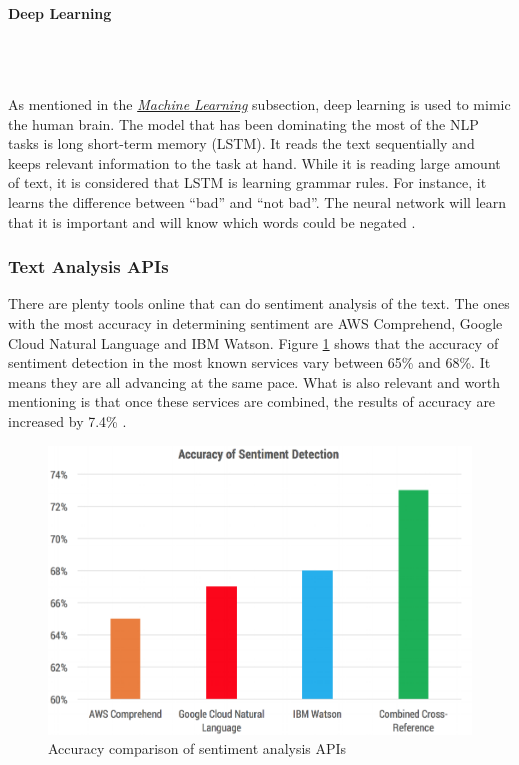 \documentclass{article}
\newcommand{\subsubsubsection}[1]{\paragraph{#1}\mbox{}\\}
\begin{document}
\subsubsubsection{Deep Learning}
{\large
\\As mentioned in the \hyperref[sec:ml]{\textit{Machine Learning}} subsection, deep learning is used to mimic the human brain. The model that has been dominating the most of the NLP tasks is long short-term memory (LSTM). It reads the text sequentially and keeps relevant information to the task at hand. While it is reading large amount of text, it is considered that LSTM is learning grammar rules. For instance, it learns the difference between ``bad'' and ``not bad''. The neural network will learn that it is important and will know which words could be negated \parencite{sentiment}.\par
}

\subsubsection{Text Analysis APIs}
{\large
There are plenty tools online that can do sentiment analysis of the text. The ones with the most accuracy in determining sentiment are AWS Comprehend, Google Cloud Natural Language and IBM Watson. Figure \ref{fig:sentimentapis} shows that the accuracy of sentiment detection in the most known services vary between 65\% and 68\%. It means they are all advancing at the same pace. What is also relevant and worth mentioning is that once these services are combined, the results of accuracy are increased by 7.4\% \parencite{sentimentapis}.\par
}

\begin{figure}[H]
  \centering
  \includegraphics[scale=0.55]{img/sentiment.png}
  \caption{Accuracy comparison of sentiment analysis APIs}
  \label{fig:sentimentapis}
\end{figure}
\end{document}
